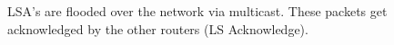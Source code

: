 LSA's are flooded over the network via multicast. These packets get acknowledged by the other routers (LS Acknowledge).